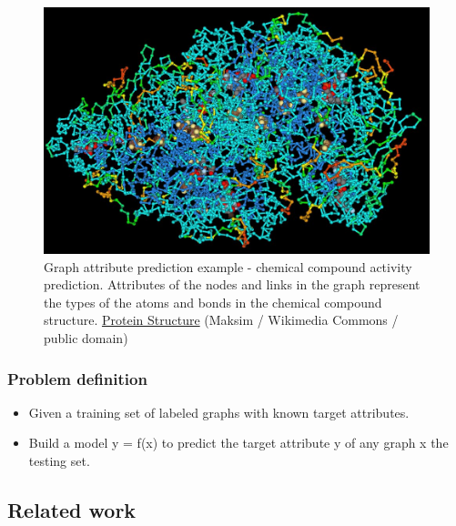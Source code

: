 \documentclass{article}
\begin{document}
\begin{landscape}
\begin{figure}[H]\centering
	\includegraphics[width=\textwidth]{ProteinStructure}
	\caption{
		Graph attribute prediction example - chemical compound activity prediction.
		Attributes of the nodes and links in the graph represent
		the types of the atoms and bonds in the chemical compound structure.
		\href{https://commons.wikimedia.org/wiki/File:ProteinStructure.jpg}
		{Protein Structure}
		(Maksim / Wikimedia Commons / public domain)
	}
	\label{fig:protein}
\end{figure}

\pagebreak
\subsubsection{Problem definition}
\begin{itemize}
	\item Given a training set of labeled graphs with known target attributes.
	\item Build a model y = f(x) to predict the target attribute y of any graph x the testing set.
\end{itemize}

\pagebreak
\subsection{Related work}


\end{landscape}
\end{document}
